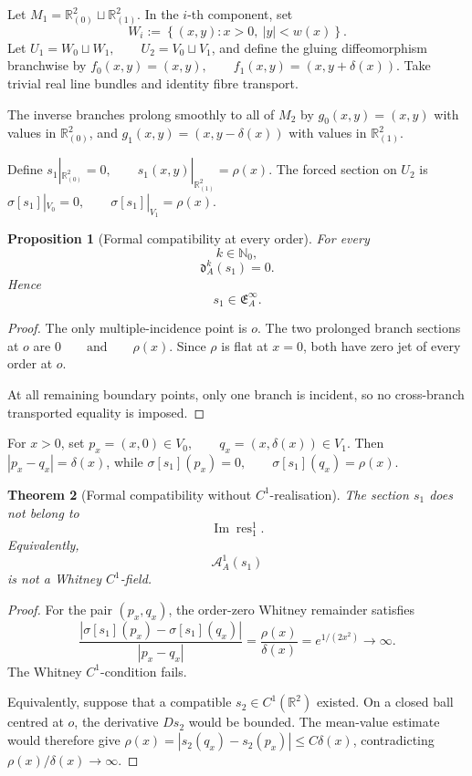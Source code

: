 \documentclass[11pt]{article}
\theoremstyle{plain}
\newtheorem{theorem}{Theorem}[section]
\newtheorem{proposition}[theorem]{Proposition}
\theoremstyle{definition}
\begin{document}
Let
\(M_1 = \mathbb R_{(0)}^2 \sqcup \mathbb R_{(1)}^2\).
In the \(i\)-th component, set
\[
  W_i
  :=
  \left\{
    (x,y):
    x>0,\
    |y|<w(x)
  \right\}.
\]
Let
\(U_1=W_0\sqcup W_1, \qquad U_2=V_0\sqcup V_1\),
and define the gluing diffeomorphism branchwise by
\(f_0(x,y)=(x,y), \qquad f_1(x,y)=(x,y+\delta(x))\).
Take trivial real line bundles and identity fibre transport.

The inverse branches prolong smoothly to all of \(M_2\) by \(g_0(x,y)=(x,y)\) with values in \(\mathbb R_{(0)}^2\), and \(g_1(x,y)=(x,y-\delta(x))\) with values in \(\mathbb R_{(1)}^2\).

Define
\(s_1|_{\mathbb R_{(0)}^2}=0, \qquad s_1(x,y)|_{\mathbb R_{(1)}^2} = \rho(x)\).
The forced section on \(U_2\) is
\(\sigma[s_1]|_{V_0}=0, \qquad \sigma[s_1]|_{V_1}=\rho(x)\).

\begin{proposition}[Formal compatibility at every order]
\label{prop:exponential-formal-compatibility}
For every
\[
  k\in\mathbb N_0,
\]
\[
  \mathfrak d_A^k(s_1)=0.
\]
Hence
\[
  s_1\in\mathfrak E_A^\infty.
\]
\end{proposition}

\begin{proof}
The only multiple-incidence point is \(o\). The two prolonged branch
sections at \(o\) are
\(0 \qquad\text{and}\qquad \rho(x)\).
Since \(\rho\) is flat at \(x=0\), both have zero jet of every order
at \(o\).

At all remaining boundary points, only one branch is incident, so no
cross-branch transported equality is imposed.
\end{proof}

For \(x>0\), set
\(p_x=(x,0)\in V_0, \qquad q_x=(x,\delta(x))\in V_1\).
Then
\(|p_x-q_x|=\delta(x)\),
while
\(\sigma[s_1](p_x)=0, \qquad \sigma[s_1](q_x)=\rho(x)\).

\begin{theorem}[Formal compatibility without \(C^1\)-realisation]
\label{thm:exponential-no-realisation}
The section \(s_1\) does not belong to
\[
  \operatorname{Im}\operatorname{res}_1^1.
\]
Equivalently,
\[
  \mathcal A_A^1(s_1)
\]
is not a Whitney \(C^1\)-field.
\end{theorem}

\begin{proof}
For the pair \((p_x,q_x)\), the order-zero Whitney remainder satisfies
\[
  \frac{
    |\sigma[s_1](p_x)-\sigma[s_1](q_x)|
  }{
    |p_x-q_x|
  }
  =
  \frac{\rho(x)}{\delta(x)}
  =
  e^{1/(2x^2)}
  \longrightarrow\infty.
\]
The Whitney \(C^1\)-condition fails.

Equivalently, suppose that a compatible \(s_2\in C^1(\mathbb R^2)\) existed. On a closed ball centred at \(o\), the derivative \(Ds_2\)
would be bounded. The mean-value estimate would therefore give
\(\rho(x) = |s_2(q_x)-s_2(p_x)| \leq C\delta(x)\),
contradicting
\(\rho(x)/\delta(x)\longrightarrow\infty\).
\end{proof}
\end{document}
